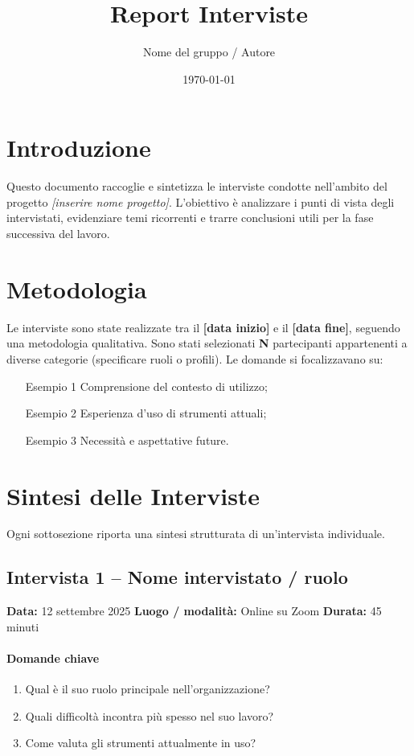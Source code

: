 \documentclass[12pt,a4paper]{article}
\title{Report Interviste}
\author{Nome del gruppo / Autore}
\date{\today}
\begin{document}
\maketitle
\tableofcontents
\newpage

\section{Introduzione}
Questo documento raccoglie e sintetizza le interviste condotte nell'ambito del progetto \textit{[inserire nome progetto]}.  
L’obiettivo è analizzare i punti di vista degli intervistati, evidenziare temi ricorrenti e trarre conclusioni utili per la fase successiva del lavoro.

\section{Metodologia}
Le interviste sono state realizzate tra il \textbf{[data inizio]} e il \textbf{[data fine]}, seguendo una metodologia qualitativa.  
Sono stati selezionati \textbf{N} partecipanti appartenenti a diverse categorie (specificare ruoli o profili).  
Le domande si focalizzavano su:
\begin{itemize}
  \item [Esempio 1] Comprensione del contesto di utilizzo;
  \item [Esempio 2] Esperienza d’uso di strumenti attuali;
  \item [Esempio 3] Necessità e aspettative future.
\end{itemize}

\section{Sintesi delle Interviste}
Ogni sottosezione riporta una sintesi strutturata di un'intervista individuale.

\subsection{Intervista 1 – Nome intervistato / ruolo}
\textbf{Data:} 12 settembre 2025  
\textbf{Luogo / modalità:} Online su Zoom  
\textbf{Durata:} 45 minuti

\paragraph{Domande chiave}
\begin{enumerate}
  \item Qual è il suo ruolo principale nell'organizzazione?
  \item Quali difficoltà incontra più spesso nel suo lavoro?
  \item Come valuta gli strumenti attualmente in uso?
\end{enumerate}
\end{document}
